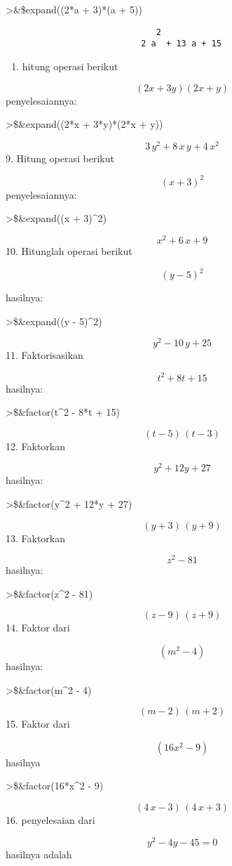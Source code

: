 \documentclass[
]{book}
\providecommand{\tightlist}{%
  \setlength{\itemsep}{0pt}\setlength{\parskip}{0pt}}
\begin{document}
\textgreater\&\$expand((2*a + 3)*(a + 5))

\begin{verbatim}
                              2
                           2 a  + 13 a + 15
\end{verbatim}

\begin{enumerate}
\def\labelenumi{\arabic{enumi}.}
\setcounter{enumi}{7}
\tightlist
\item
  hitung operasi berikut
\end{enumerate}

\[(2x + 3y)(2x + y)\]penyelesaiannya:

\textgreater\$\&expand((2*x + 3*y)*(2*x + y))

\[3\,y^2+8\,x\,y+4\,x^2\] 9. Hitung operasi berikut

\[(x + 3)^2\]penyelesaiannya:

\textgreater\$\&expand((x + 3)\^{}2)

\[x^2+6\,x+9\] 10. Hitunglah operasi berikut

\[(y - 5)^2\]

hasilnya:

\textgreater\$\&expand((y - 5)\^{}2)

\[y^2-10\,y+25\] 11. Faktorisasikan

\[t^2 + 8t + 15\]hasilnya:

\textgreater\$\&factor(t\^{}2 - 8*t + 15)

\[\left(t-5\right)\,\left(t-3\right)\] 12. Faktorkan

\[y^2 + 12y + 27\]hasilnya:

\textgreater\$\&factor(y\^{}2 + 12*y + 27)

\[\left(y+3\right)\,\left(y+9\right)\] 13. Faktorkan

\[z^2 - 81\]hasilnya:

\textgreater\$\&factor(z\^{}2 - 81)

\[\left(z-9\right)\,\left(z+9\right)\] 14. Faktor dari

\[(m^2 - 4)\]hasilnya:

\textgreater\$\&factor(m\^{}2 - 4)

\[\left(m-2\right)\,\left(m+2\right)\] 15. Faktor dari

\[(16x^2 - 9)\]hasilnya

\textgreater\$\&factor(16*x\^{}2 - 9)

\[\left(4\,x-3\right)\,\left(4\,x+3\right)\] 16. penyelesaian dari

\[y^2 - 4y - 45 = 0\]hasilnya adalah
\end{document}
